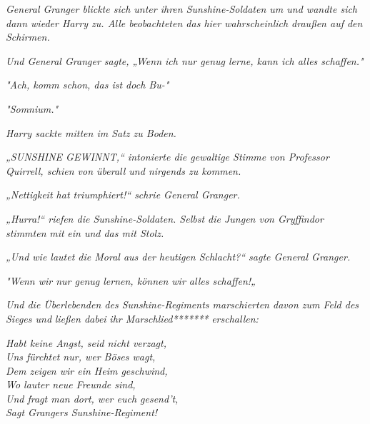 {\emph{General Granger blickte sich unter ihren Sunshine-Soldaten um und wandte sich dann wieder Harry zu. Alle beobachteten das hier wahrscheinlich draußen auf den Schirmen.}

\emph{Und General Granger sagte, „Wenn ich nur genug lerne, kann ich alles schaffen."}

\emph{"Ach, komm schon, das ist doch Bu-"}

\emph{"\emph{Somnium.}"}

\emph{Harry sackte mitten im Satz zu Boden.}

\emph{„SUNSHINE GEWINNT,“ intonierte die gewaltige Stimme von Professor Quirrell, schien von überall und nirgends zu kommen.}

\emph{„Nettigkeit hat triumphiert!“ schrie General Granger.}

\emph{„\emph{Hurra!}“ riefen die Sunshine-Soldaten. Selbst die Jungen von Gryffindor stimmten} \emph{mit} \emph{ein und das mit Stolz.}

\emph{„Und wie lautet die Moral aus der heutigen Schlacht?“ sagte General Granger.}

\emph{"\emph{Wenn wir nur genug lernen, können wir alles schaffen!}„}

\emph{Und die Überlebenden des Sunshine-Regiments marschierten davon zum Feld des Sieges und} \emph{ließen dabei} \emph{ihr Marschlied*******} \emph{erschallen:}

\emph{\emph{Habt keine Angst, seid nicht verzagt,\\ Uns fürchtet nur, wer Böses wagt,\\ Dem zeigen wir ein Heim geschwind,\\ Wo lauter neue Freunde sind,\\ Und fragt man dort, wer euch gesend't,\\ Sagt Grangers Sunshine-Regiment!}}

}
